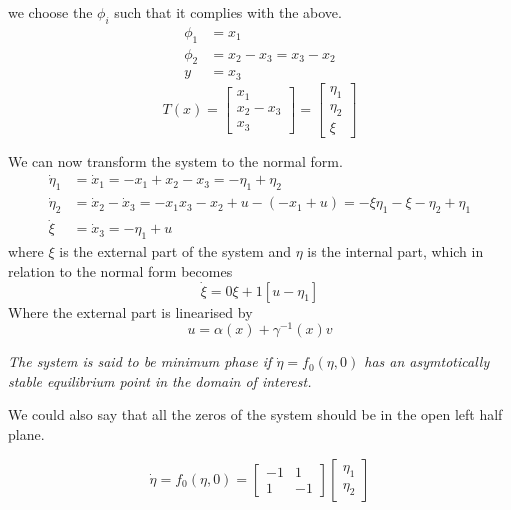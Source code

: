 we choose the $\phi_i$ such that it complies with the above.
\begin{equation}
        \begin{split}
                \phi_1 &= x_1 \\
                \phi_2 &= x_2 - x_3 = x_3 - x_2 \\
                y &= x_3
        \end{split}
\end{equation}
\begin{equation}
        T(x) = 
        \begin{bmatrix}
                x_1 \\
                x_2 - x_3 \\
                x_3
        \end{bmatrix}
        =
        \begin{bmatrix}
                \eta_1 \\
                \eta_2 \\
                \xi
        \end{bmatrix}
\end{equation}

We can now transform the system to the normal form.
\begin{equation}
        \begin{split}
        \dot{\eta}_{1} &= \dot{x}_{1} = -x_1 + x_2 - x_3 = -\eta_1 + \eta_2 \\
        \dot{\eta}_2 &= \dot{x}_2 - \dot{x}_3 = -x_1 x_3 - x_2 + u - (-x_1 + u) = -\xi \eta_1 - \xi - \eta_2 + \eta_1 \\
        \dot{\xi} &= \dot{x}_3 = -\eta_1 + u
        \end{split}
\end{equation}
where $\xi$ is the external part of the system and $\eta$ is the internal part, which in relation to the normal form becomes
\begin{equation}
        \dot{\xi} = 0\xi + 1\left[u - \eta_1\right]
\end{equation}
Where the external part is linearised by
\begin{equation}
        u = \alpha(x) + \gamma^{-1} (x) v
\end{equation}

\textit{The system is said to be minimum phase if $\dot{\eta} = f_0(\eta,0)$ has an asymtotically stable equilibrium point in the domain of interest.}

We could also say that all the zeros of the system should be in the open left half plane.

\begin{equation}
        \dot{\eta} = f_0(\eta,0) = 
        \begin{bmatrix}
                -1 & 1 \\
                1 & -1
        \end{bmatrix}
        \begin{bmatrix}
                \eta_1 \\
                \eta_2
        \end{bmatrix}
\end{equation}